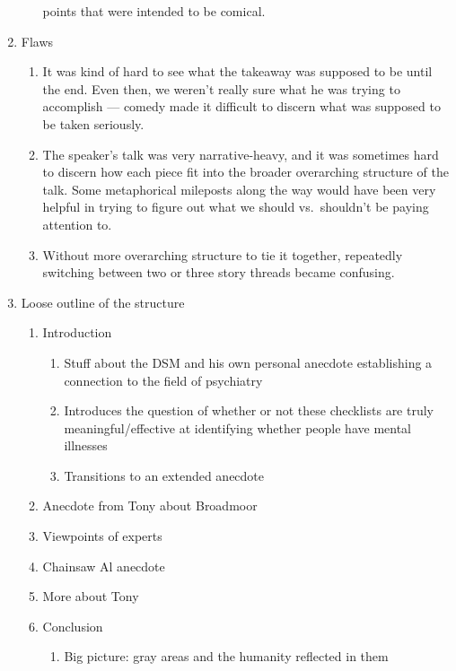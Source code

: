 \documentclass{fkpset}
\begin{document}
\begin{solution}[Answers.]
\begin{enumerate}[label=\arabic*.]
\begin{enumerate}
          points that were intended to be comical.
      \end{enumerate}
    \item Flaws
      \begin{enumerate}
        \item It was kind of hard to see what the takeaway was supposed to be
          until the end. Even then, we weren't really sure what he was trying to
          accomplish --- comedy made it difficult to discern what was supposed
          to be taken seriously.
        \item The speaker's talk was very narrative-heavy, and it was sometimes
          hard to discern how each piece fit into the broader overarching
          structure of the talk. Some metaphorical mileposts along the way would
          have been very helpful in trying to figure out what we should vs.\
          shouldn't be paying attention to.
        \item Without more overarching structure to tie it together, repeatedly
          switching between two or three story threads became confusing.
      \end{enumerate}
    \item Loose outline of the structure
      \begin{enumerate}
        \item Introduction
          \begin{enumerate}[label=\roman*.]
            \item Stuff about the DSM and his own personal anecdote establishing
              a connection to the field of psychiatry
            \item Introduces the question of whether or not these checklists are
              truly meaningful/effective at identifying whether people have
              mental illnesses
            \item Transitions to an extended anecdote
          \end{enumerate}
        \item Anecdote from Tony about Broadmoor
        \item Viewpoints of experts
        \item Chainsaw Al anecdote
        \item More about Tony
        \item Conclusion
          \begin{enumerate}[label=\roman*.]
            \item Big picture: gray areas and the humanity reflected in them

\end{enumerate}
\end{enumerate}
\end{enumerate}
\end{solution}
\end{document}
